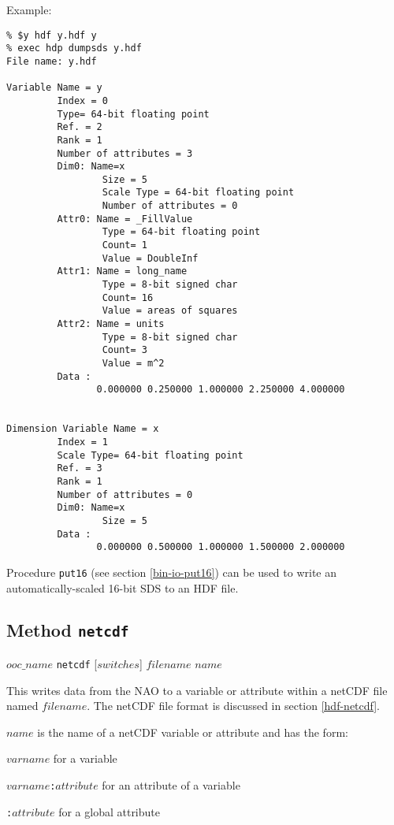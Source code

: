 Example:
  \begin{verbatim}
% $y hdf y.hdf y
% exec hdp dumpsds y.hdf
File name: y.hdf 

Variable Name = y
         Index = 0
         Type= 64-bit floating point
         Ref. = 2
         Rank = 1
         Number of attributes = 3
         Dim0: Name=x
                 Size = 5
                 Scale Type = 64-bit floating point
                 Number of attributes = 0
         Attr0: Name = _FillValue
                 Type = 64-bit floating point 
                 Count= 1
                 Value = DoubleInf 
         Attr1: Name = long_name
                 Type = 8-bit signed char 
                 Count= 16
                 Value = areas of squares
         Attr2: Name = units
                 Type = 8-bit signed char 
                 Count= 3
                 Value = m^2
         Data : 
                0.000000 0.250000 1.000000 2.250000 4.000000 


Dimension Variable Name = x
         Index = 1
         Scale Type= 64-bit floating point
         Ref. = 3
         Rank = 1
         Number of attributes = 0
         Dim0: Name=x
                 Size = 5
         Data : 
                0.000000 0.500000 1.000000 1.500000 2.000000 
\end{verbatim}

Procedure \texttt{put16}
(see section  \ref{bin-io-put16})
 can be used to write an automatically-scaled 16-bit SDS to an HDF file.

\subsection{Method \texttt{netcdf}}
    \label{ooc-write-netcdf}

  $ooc\_name$ \texttt{netcdf} [$switches$]  $filename$ $name$

This writes data from the NAO to a variable or attribute within a
  netCDF file named 
  $filename$.
The netCDF file format is discussed in section \ref{hdf-netcdf}.

  $name$ is the name of a netCDF variable or attribute and has
  the form:
\begin{bullets}
    \item $varname$ for a variable
    \item $varname$\texttt{:}$attribute$ for an attribute of a variable
    \item \texttt{:}$attribute$ for a global attribute
\end{bullets}

